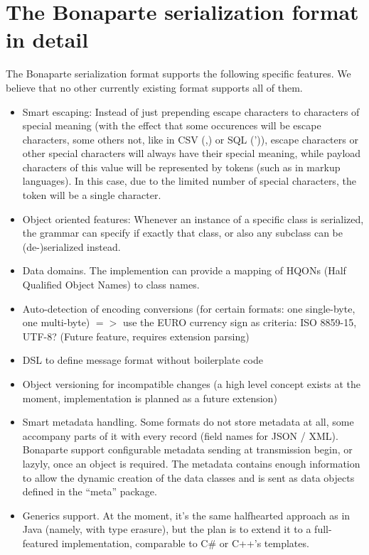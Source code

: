 \documentclass[11pt,a4paper,oneside]{article}
\begin{document}
\section{The Bonaparte serialization format in detail}
The Bonaparte serialization format supports the following specific features. We believe that no other
currently existing format supports all of them.
\begin{itemize}
    \item Smart escaping: Instead of just prepending escape characters to
    characters of special meaning (with the effect that some occurences will be escape characters, some others not, like in CSV (,) or SQL (')), escape characters or other special
    characters will always have their special meaning, while payload characters of this value will be represented by tokens
    (such as in markup languages). In this case, due to the limited number of special characters, the token will be a single
    character.
    \item Object oriented features: Whenever an instance of a specific class is
    serialized, the grammar can specify if exactly that class, or also any
    subclass can be (de-)serialized instead.
    \item Data domains. The implemention can provide a mapping of HQONs (Half
    Qualified Object Names) to class names.
    \item Auto-detection of encoding conversions (for certain formats: one single-byte, one multi-byte) $=>$ use the EURO currency
    sign as criteria:
    ISO 8859-15, UTF-8? (Future feature, requires extension parsing)
    \item DSL to define message format without boilerplate code
    \item Object versioning for incompatible changes (a high level concept exists at the moment, implementation is planned as a future extension)
    \item Smart metadata handling. Some formats do not store metadata at all,
    some accompany parts of it with every record (field names for JSON / XML).
    Bonaparte support configurable metadata sending at transmission begin, or
    lazyly, once an object is required. The metadata contains enough information
    to allow the dynamic creation of the data classes and is sent as data
    objects defined in the ``meta'' package.
    \item Generics support. At the moment, it's the same halfhearted approach as in Java (namely, with type erasure), but the plan is to extend it to
    a full-featured implementation, comparable to C\# or C++'s templates.
\end{itemize}
\end{document}
